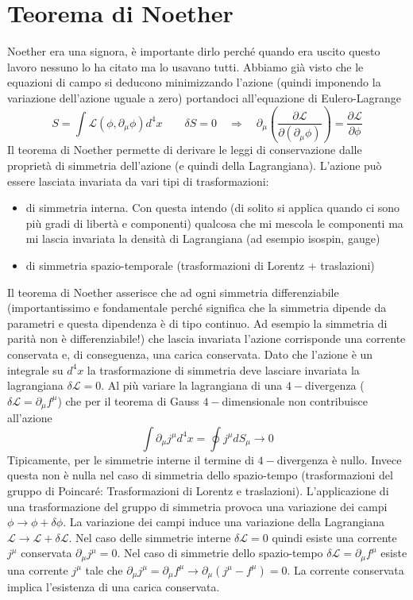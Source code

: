 \section{Teorema di Noether}
Noether era una signora, è importante dirlo perché quando era uscito questo lavoro nessuno lo ha citato ma lo usavano tutti. Abbiamo già visto che le equazioni di campo si deducono minimizzando l'azione (quindi imponendo la variazione dell'azione uguale a zero) portandoci all'equazione di Eulero-Lagrange
$$
S = \int \mathcal{L}(\phi, \partial_\mu \phi) d^4x \qquad \delta S = 0 \quad \Longrightarrow \quad \partial_\mu \left( \frac{\partial \mathcal{L}}{\partial (\partial_\mu \phi)} \right) = \frac{\partial \mathcal{L}}{\partial \phi}
$$
Il teorema di Noether permette di derivare le leggi di conservazione dalle proprietà di simmetria dell'azione (e quindi della Lagrangiana). L'azione può essere lasciata invariata da vari tipi di trasformazioni:
\begin{itemize}
    \item di simmetria interna. Con questa intendo (di solito si applica quando ci sono più gradi di libertà e componenti) qualcosa che mi mescola le componenti ma mi lascia invariata la densità di Lagrangiana (ad esempio isospin, gauge)
    \item di simmetria spazio-temporale (trasformazioni di Lorentz + traslazioni)
\end{itemize}
Il teorema di Noether asserisce che ad ogni simmetria differenziabile (importantissimo e fondamentale perché significa che la simmetria dipende da parametri e questa dipendenza è di tipo continuo. Ad esempio la simmetria di parità non è differenziabile!) che lascia invariata l'azione corrisponde una corrente conservata e, di conseguenza, una carica conservata. Dato che l'azione è un integrale su $d^4x$ la trasformazione di simmetria deve lasciare invariata la lagrangiana $\delta\mathcal{L}=0$. Al più variare la lagrangiana di una $4-$divergenza ($\delta\mathcal{L}=\partial_\mu f^\mu$) che per il teorema di Gauss $4-$dimensionale non contribuisce all'azione
$$
\int \partial_\mu j^\mu d^4x = \oint j^\mu dS_\mu \to 0
$$
Tipicamente, per le simmetrie interne il termine di $4-$divergenza è nullo. Invece questa non è nulla nel caso di simmetria dello spazio-tempo (trasformazioni del gruppo di Poincaré: Trasformazioni di Lorentz e traslazioni). L'applicazione di una trasformazione del gruppo di simmetria provoca una variazione dei campi $\phi\to\phi+\delta\phi$. La variazione dei campi induce una variazione della Lagrangiana $\mathcal{L}\to\mathcal{L}+\delta\mathcal{L}$. Nel caso delle simmetrie interne $\delta\mathcal{L}=0$ quindi esiste una corrente $j^\mu$ conservata $\partial_\mu j^\mu=0$. Nel caso di simmetrie dello spazio-tempo $\delta\mathcal{L}=\partial_\mu f^\mu$ esiste una corrente $j^\mu$ tale che $\partial_\mu j^\mu=\partial_\mu f^\mu \to \partial_\mu(j^\mu-f^\mu)=0$. La corrente conservata implica l'esistenza di una carica conservata.
